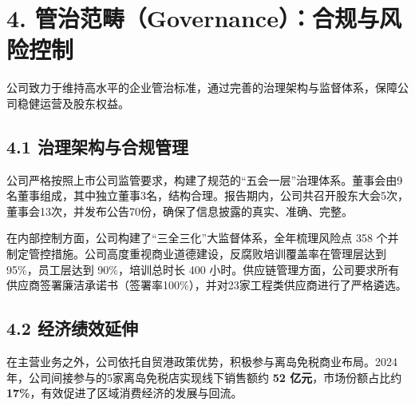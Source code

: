 \documentclass[a4paper,12pt]{article}
\begin{document}
\section{4. 管治范畴（Governance）：合规与风险控制}

公司致力于维持高水平的企业管治标准，通过完善的治理架构与监督体系，保障公司稳健运营及股东权益。

\subsection{4.1 治理架构与合规管理}

公司严格按照上市公司监管要求，构建了规范的“五会一层”治理体系。董事会由9名董事组成，其中独立董事3名，结构合理。报告期内，公司共召开股东大会5次，董事会13次，并发布公告70份，确保了信息披露的真实、准确、完整。

在内部控制方面，公司构建了“三全三化”大监督体系，全年梳理风险点 358 个并制定管控措施。公司高度重视商业道德建设，反腐败培训覆盖率在管理层达到 95\%，员工层达到 90\%，培训总时长 400 小时。供应链管理方面，公司要求所有供应商签署廉洁承诺书（签署率100\%），并对23家工程类供应商进行了严格遴选。

\subsection{4.2 经济绩效延伸}

在主营业务之外，公司依托自贸港政策优势，积极参与离岛免税商业布局。2024年，公司间接参与的5家离岛免税店实现线下销售额约 \textbf{52 亿元}，市场份额占比约 \textbf{17\%}，有效促进了区域消费经济的发展与回流。
\end{document}
